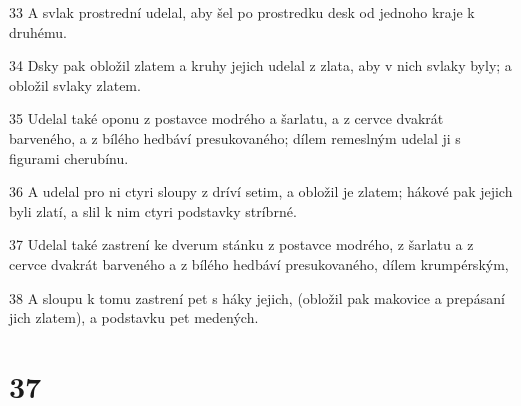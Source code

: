 \par 33 A svlak prostrední udelal, aby šel po prostredku desk od jednoho kraje k druhému.
\par 34 Dsky pak obložil zlatem a kruhy jejich udelal z zlata, aby v nich svlaky byly; a obložil svlaky zlatem.
\par 35 Udelal také oponu z postavce modrého a šarlatu, a z cervce dvakrát barveného, a z bílého hedbáví presukovaného; dílem remeslným udelal ji s figurami cherubínu.
\par 36 A udelal pro ni ctyri sloupy z dríví setim, a obložil je zlatem; hákové pak jejich byli zlatí, a slil k nim ctyri podstavky stríbrné.
\par 37 Udelal také zastrení ke dverum stánku z postavce modrého, z šarlatu a z cervce dvakrát barveného a z bílého hedbáví presukovaného, dílem krumpérským,
\par 38 A sloupu k tomu zastrení pet s háky jejich, (obložil pak makovice a prepásaní jich zlatem), a podstavku pet medených.

\chapter{37}

